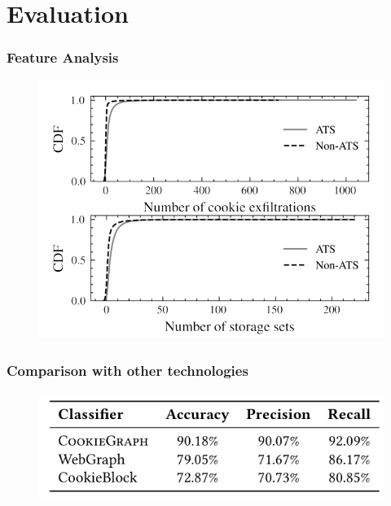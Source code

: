 \documentclass{beamer}
\begin{document}
\section{Evaluation}

\begin{frame}
\frametitle{Feature Analysis}

\begin{figure}
\includegraphics[scale=0.3]{img/featureanalysis}
\end{figure}

\end{frame}

\begin{frame}
\frametitle{Comparison with other technologies}

\begin{figure}
\includegraphics[scale=0.5]{img/classacc}
\end{figure}

\end{frame}
\end{document}
